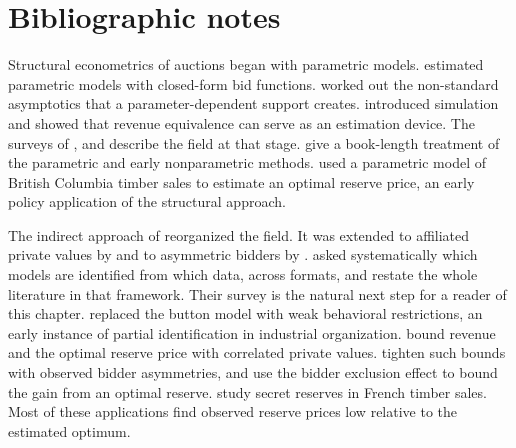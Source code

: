 





\section{Bibliographic notes}\label{sec:15-notes}

Structural econometrics of auctions began with parametric models. \citet{Paarsch1992} estimated parametric
models with closed-form bid functions. \citet{DonaldPaarsch1993,DonaldPaarsch1996} worked out the
non-standard asymptotics that a parameter-dependent support creates. \citet{LaffontOssardVuong1995} introduced
simulation and showed that revenue equivalence can serve as an estimation device. The surveys of
\citet{HendricksPaarsch1995}, \citet{Laffont1997} and \citet{PerrigneVuong1999} describe the field at that
stage. \citet{PaarschHong2006} give a book-length treatment of the parametric and early nonparametric methods.
\citet{Paarsch1997} used a parametric model of British Columbia timber sales to estimate an optimal reserve
price, an early policy application of the structural approach.

The indirect approach of \citet{GuerrePerrigneVuong2000} reorganized the field. It was extended to affiliated
private values by \citet{LiPerrigneVuong2002} and to asymmetric bidders by \citet{CampoPerrigneVuong2003}.
\citet{AtheyHaile2002} asked systematically which models are identified from which data, across formats, and
\citet{AtheyHaile2007} restate the whole literature in that framework. Their survey is the natural next step
for a reader of this chapter. \citet{HaileTamer2003} replaced the button model with weak behavioral
restrictions, an early instance of partial identification in industrial organization.
\citet{AradillasLopezGandhiQuint2013} bound revenue and the optimal reserve price with correlated private
values. \citet{CoeyEtAl2017} tighten such bounds with observed bidder asymmetries, and
\citet{CoeyLarsenSweeney2019} use the bidder exclusion effect to bound the gain from an optimal reserve.
\citet{LiPerrigne2003} study secret reserves in French timber sales. Most of these applications find observed
reserve prices low relative to the estimated optimum.

